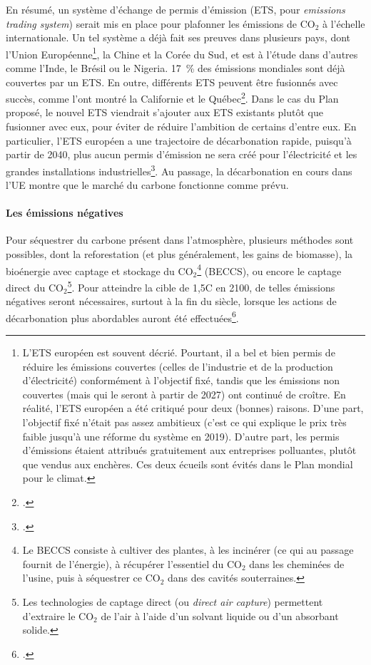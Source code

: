 \documentclass[a5paper,french,openany]{memoir}
\begin{document}
En résumé, un système d'échange de permis d'émission (ETS, pour \textit{emissions trading system}) serait mis en place pour plafonner les émissions de CO$_\text{2}$ à l'échelle internationale. 
Un tel système a déjà fait ses preuves dans plusieurs pays, dont l'Union Européenne\footnote{L'ETS européen est souvent décrié. Pourtant, il a bel et bien permis de réduire les émissions couvertes (celles de l'industrie et de la production d'électricité) conformément à l'objectif fixé, tandis que les émissions non couvertes (mais qui le seront à partir de 2027) ont continué de croître. En réalité, l'ETS européen a été critiqué pour deux (bonnes) raisons. D'une part, l'objectif fixé n'était pas assez ambitieux (c'est ce qui explique le prix très faible jusqu'à une réforme du système en 2019). D'autre part, les permis d'émissions étaient attribués gratuitement aux entreprises polluantes, plutôt que vendus aux enchères. Ces deux écueils sont évités dans le Plan mondial pour le climat.}, la Chine et la Corée du Sud, et est à l'étude dans d'autres comme l'Inde, le Brésil ou le Nigeria. 17~\% des émissions mondiales sont déjà couvertes par un ETS. En outre, différents ETS peuvent être fusionnés avec succès, comme l'ont montré la Californie et le Québec\footnote{\citet{icap_emissions_2023}.}. Dans le cas du Plan proposé, le nouvel ETS viendrait s'ajouter aux ETS existants plutôt que fusionner avec eux, pour éviter de réduire l'ambition de certains d'entre eux. En particulier, l'ETS européen a une trajectoire de décarbonation rapide, puisqu'à partir de 2040, plus aucun permis d'émission ne sera créé pour l'électricité et les grandes installations industrielles\footnote{\cite{pahle_emerging_2023}.}. Au passage, la décarbonation en cours dans l'UE montre que le marché du carbone fonctionne comme prévu.

\paragraph{Les émissions négatives}
Pour séquestrer du carbone présent dans l'atmosphère, plusieurs méthodes sont possibles, dont la reforestation (et plus généralement, les gains de biomasse), la bioénergie avec captage et stockage du CO$_\text{2}$\footnote{Le BECCS consiste à cultiver des plantes, à les incinérer (ce qui au passage fournit de l'énergie), à récupérer l'essentiel du CO$_\text{2}$ dans les cheminées de l'usine, puis à séquestrer ce CO$_\text{2}$ dans des cavités souterraines.} (BECCS), ou encore le captage direct du CO$_\text{2}$\footnote{Les technologies de captage direct (ou \textit{direct air capture}) permettent d'extraire le CO$_\text{2}$ de l'air à l'aide d'un solvant liquide ou d'un absorbant solide.}. Pour atteindre la cible de 1,5\textdegree{}C en 2100, de telles émissions négatives seront nécessaires, surtout à la fin du siècle, lorsque les actions de décarbonation plus abordables auront été effectuées\footnote{\cite{minx_negative_2018}.}. 
\end{document}

